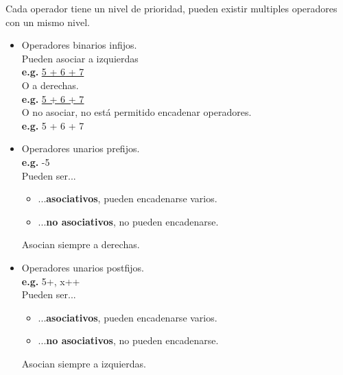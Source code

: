 \documentclass[\main/ApuntesPL.tex]{subfiles}
\begin{document}
      \par
      Cada operador tiene un nivel de prioridad, pueden existir multiples operadores con un mismo
      nivel.
      \begin{itemize}
        \item Operadores binarios infijos.\\
          \hspace{3mm}Pueden asociar a izquierdas\\
          \hspace{5mm}\textbf{e.g.} \underline{\underline{5 + 6} + 7}\\
          \vspace{2mm}
          \hspace{3mm}O a derechas.\\
          \hspace{5mm}\textbf{e.g.} \underline{5 + \underline{6 + 7}}\\
          \vspace{2mm}
          \hspace{3mm}O no asociar, no está permitido encadenar operadores.\\
          \hspace{5mm}\textbf{e.g.} {\color{red}5 + 6 + 7}
        \item Operadores unarios prefijos.\\
          \hspace{3mm}\textbf{e.g.} -5\\
          \vspace{2mm}
          Pueden ser...
          \begin{itemize}
            \item ...\textbf{asociativos}, pueden encadenarse varios.
            \item ...\textbf{no asociativos}, no pueden encadenarse.
          \end{itemize}
          Asocian siempre a derechas.
        \item Operadores unarios postfijos.\\
          \hspace{3mm}\textbf{e.g.} 5+, x++\\
          \vspace{2mm}
            Pueden ser...
            \begin{itemize}
              \item ...\textbf{asociativos}, pueden encadenarse varios.
              \item ...\textbf{no asociativos}, no pueden encadenarse.
            \end{itemize}
            Asocian siempre a izquierdas.
      \end{itemize}
\end{document}
